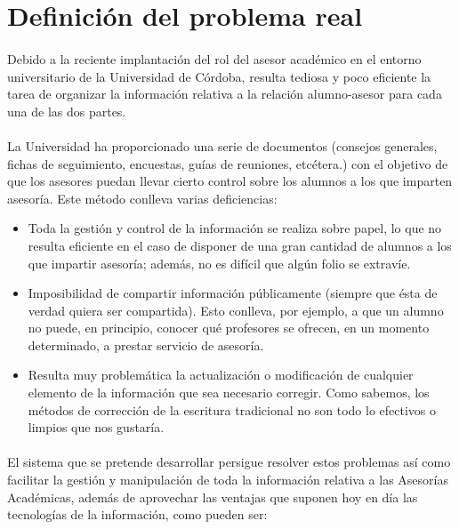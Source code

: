 \section{Definición del problema real}

\paragraph{}Debido a la reciente implantación del rol del asesor académico en el
entorno
universitario de la Universidad de Córdoba, resulta tediosa y poco eficiente la
tarea de organizar la información relativa a la relación alumno-asesor para
cada una de las dos partes.

\paragraph{}La Universidad ha proporcionado una serie de documentos (consejos
generales, fichas de seguimiento, encuestas, guías de reuniones, etcétera.) con
el objetivo de que los asesores puedan llevar cierto control sobre los alumnos
a los que imparten asesoría. Este método conlleva varias deficiencias:

\begin{itemize}
 \item Toda la gestión y control de la información se realiza sobre papel, lo
       que no resulta eficiente en el caso de disponer de una gran cantidad de
       alumnos a los que impartir asesoría; además, no es difícil que algún
       folio se extravíe.
 \item Imposibilidad de compartir información públicamente (siempre que ésta
       de verdad quiera ser compartida). Esto conlleva, por ejemplo, a que un
       alumno no puede, en principio, conocer qué profesores se ofrecen, en un
       momento determinado, a prestar servicio de asesoría.
 \item Resulta muy problemática la actualización o modificación de cualquier
       elemento de la información que sea necesario corregir. Como sabemos, los
       métodos de corrección de la escritura tradicional no son todo lo
       efectivos o limpios que nos gustaría.
\end{itemize}

\paragraph{}El sistema que se pretende desarrollar persigue resolver estos
problemas así
como facilitar la gestión y manipulación de toda la información relativa a
las Asesorías Académicas, además de aprovechar las ventajas que suponen hoy en
día las tecnologías de la información, como pueden ser:

